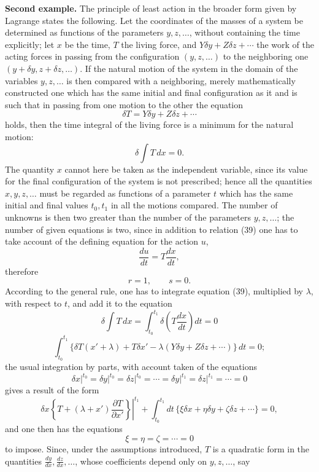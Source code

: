 \documentclass[11pt,a4paper,leqno]{article}
\begin{document}
\noindent\textbf{Second example.} The principle of least action in the broader form given by Lagrange states the following. Let the coordinates of the masses of a system be determined as functions of the parameters $y,z,\ldots$, without containing the time explicitly; let $x$ be the time, $T$ the living force, and $Y\delta y+Z\delta z+\cdots$ the work of the acting forces in passing from the configuration $(y,z,\ldots)$ to the neighboring one $(y+\delta y,z+\delta z,\ldots)$. If the natural motion of the system in the domain of the variables $y,z,\ldots$ is then compared with a neighboring, merely mathematically constructed one which has the same initial and final configuration as it
and is such that in passing from one motion to the other the equation
\begin{equation}\tag{39}
\delta T=Y\delta y+Z\delta z+\cdots
\end{equation}
holds, then the time integral of the living force is a minimum for the natural motion:
\[
\delta\int T\,dx=0.
\]
The quantity $x$ cannot here be taken as the independent variable, since its value for the final configuration of the system is not prescribed; hence all the quantities $x,y,z,\ldots$ must be regarded as functions of a parameter $t$ which has the same initial and final values $t_0,t_1$ in all the motions compared. The number of unknowns is then two greater than the number of the parameters $y,z,\ldots$; the number of given equations is two, since in addition to relation (39) one has to take account of the defining equation for the action $u$,
\[
\frac{du}{dt}=T\frac{dx}{dt},
\]
therefore
\[
r=1,\qquad s=0.
\]
According to the general rule, one has to integrate equation (39), multiplied by $\lambda$, with respect to $t$, and add it to the equation
\[
\delta\int T\,dx=\int_{t_0}^{t_1}\delta\left(T\frac{dx}{dt}\right)dt=0
\]
\[
\int_{t_0}^{t_1}\{\delta T(x'+\lambda)+T\delta x'
-\lambda(Y\delta y+Z\delta z+\cdots)\}\,dt=0;
\]
the usual integration by parts, with account taken of the equations
\[
\left.\delta x\right|^{t_0}=\left.\delta y\right|^{t_0}
=\left.\delta z\right|^{t_0}=\cdots
=\left.\delta y\right|^{t_1}=\left.\delta z\right|^{t_1}=\cdots=0
\]
gives a result of the form
\[
\left.\delta x\left\{T+(\lambda+x')\frac{\partial T}{\partial x'}\right\}\right|^{t_1}
+\int_{t_0}^{t_1}dt\,\{\xi\delta x+\eta\delta y+\zeta\delta z+\cdots\}=0,
\]
and one then has the equations
\[
\xi=\eta=\zeta=\cdots=0
\]
to impose. Since, under the assumptions introduced, $T$ is a quadratic form in the quantities $\frac{dy}{dx},\frac{dz}{dx},\ldots$, whose coefficients depend only on $y,z,\ldots$, say
\end{document}
